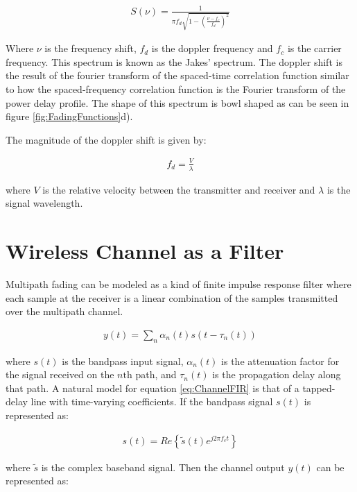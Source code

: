 \begin{align}
	S(\nu) = \frac{1}{\pi f_{d} \sqrt{1 - %
		(\frac{\nu - f_{c}}{f_{d}})^{2}}}
\end{align}

Where $\nu$ is the frequency shift, $f_{d}$ is the %
doppler frequency and $f_{c}$ is the carrier frequency. %
This spectrum is known as the Jakes' spectrum\cite{Iskander}. %
The doppler shift is the result of the fourier transform %
of the spaced-time correlation function similar to how %
the spaced-frequency correlation function is the %
Fourier transform of the power delay profile. The %
shape of this spectrum is bowl shaped as can be seen in %
figure \ref{fig:FadingFunctions}d).

The magnitude of the doppler shift is given by:

\begin{align}
	f_{d} = \frac{V}{\lambda}
\end{align}

where $V$ is the relative velocity between the %
transmitter and receiver and $\lambda$ is the signal %
wavelength.

\section{Wireless Channel as a Filter}

Multipath fading can be modeled as a kind of %
finite impulse response filter where each %
sample at the receiver is a linear combination %
of the samples transmitted over the multipath %
channel.

\begin{align}
	y(t) = \sum_{n} \alpha_{n}(t)s(t-\tau_{n}(t))
	\label{eq:ChannelFIR}
\end{align}

where $s(t)$ is the bandpass input signal, $\alpha_n(t)$ %
is the attenuation factor for the signal received %
on the $n\text{th}$ path, and $\tau_n(t)$ is the %
propagation delay along that path. A natural model %
for equation \ref{eq:ChannelFIR} is that of a %
tapped-delay line with time-varying coefficients. %
If the bandpass signal $s(t)$ is represented as:

\begin{align}
	s(t) = Re\left\{ \tilde{s}%
	(t)e^{j2\pi f_{c} t} \right\}
\end{align}

where $\tilde{s}$ is the complex baseband signal. %
Then the channel output $y(t)$ can be represented as:

